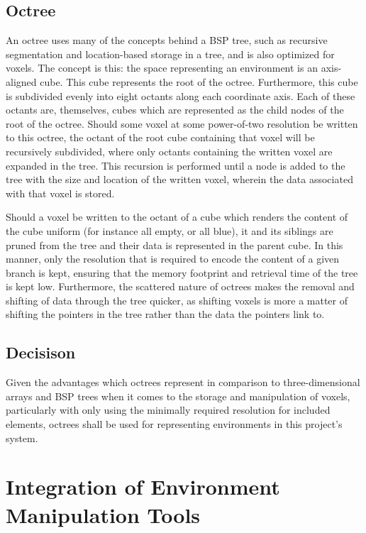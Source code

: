 \documentclass[onecolumn, draftclsnofoot,10pt, compsoc]{IEEEtran}
\begin{document}
\subsection{Octree}
An octree uses many of the concepts behind a BSP tree, such as recursive segmentation and location-based storage in a tree, and is also optimized for voxels. The concept is this: the space representing an environment is an axis-aligned cube. This cube represents the root of the octree. Furthermore, this cube is subdivided evenly into eight octants along each coordinate axis. Each of these octants are, themselves, cubes which are represented as the child nodes of the root of the octree. Should some voxel at some power-of-two resolution be written to this octree, the octant of the root cube containing that voxel will be recursively subdivided, where only octants containing the written voxel are expanded in the tree. This recursion is performed until a node is added to the tree with the size and location of the written voxel, wherein the data associated with that voxel is stored.

Should a voxel be written to the octant of a cube which renders the content of the cube uniform (for instance all empty, or all blue), it and its siblings are pruned from the tree and their data is represented in the parent cube. In this manner, only the resolution that is required to encode the content of a given branch is kept, ensuring that the memory footprint and retrieval time of the tree is kept low. Furthermore, the scattered nature of octrees makes the removal and shifting of data through the tree quicker, as shifting voxels is more a matter of shifting the pointers in the tree rather than the data the pointers link to.




\subsection{Decisison}
Given the advantages which octrees represent in comparison to three-dimensional arrays and BSP trees when it comes to the storage and manipulation of voxels, particularly with only using the minimally required resolution for included elements, octrees shall be used for representing environments in this project’s system.



\section{Integration of Environment Manipulation Tools}
\end{document}
